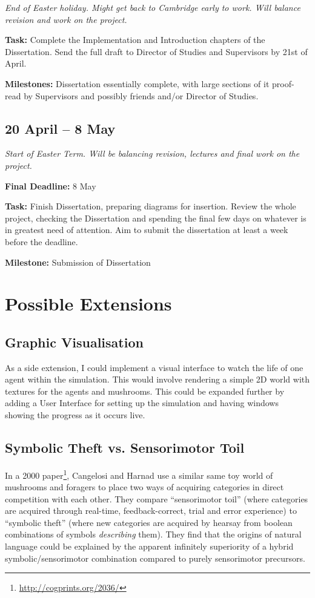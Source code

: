 \documentclass[12pt,a4paper,twoside]{article}
\begin{document}
\emph{End of Easter holiday. Might get back to Cambridge early to work. Will balance revision and work on the project.}

{\bf Task:} Complete the Implementation and Introduction chapters of the Dissertation. Send the full draft to Director of Studies and Supervisors by 21st of April.

{\bf Milestones:} Dissertation essentially complete, with large sections of it proof-read by Supervisors and possibly friends and/or Director of Studies.

\subsection*{20 April -- 8 May}

\emph{Start of Easter Term. Will be balancing revision, lectures and final work on the project.}

{\bf Final Deadline:} 8 May

{\bf Task:} Finish Dissertation, preparing diagrams for insertion. Review the whole project, checking the Dissertation and spending the final few days on whatever is in greatest need of attention. Aim to submit the dissertation at least a week before the deadline.

{\bf Milestone:} Submission of Dissertation

\section*{Possible Extensions}

\subsection*{Graphic Visualisation}

As a side extension, I could implement a visual interface to watch the life of one agent within the simulation. This would involve rendering a simple 2D world with textures for the agents and mushrooms. This could be expanded further by adding a User Interface for setting up the simulation and having windows showing the progress as it occurs live.

\subsection*{Symbolic Theft vs. Sensorimotor Toil}

In a 2000 paper\footnote{\url{http://cogprints.org/2036/}}, Cangelosi and Harnad use a similar same toy world of mushrooms and foragers to place two ways of acquiring categories in direct competition with each other. They compare ``sensorimotor toil'' (where categories are acquired through real-time, feedback-correct, trial and error experience) to ``symbolic theft'' (where new categories are acquired by hearsay from boolean combinations of symbols \emph{describing} them). They find that the origins of natural language could be explained by the apparent infinitely superiority of a hybrid symbolic/sensorimotor combination compared to purely sensorimotor precursors. 
\end{document}
